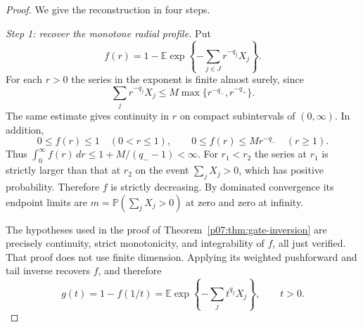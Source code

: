 \documentclass[11pt,letterpaper]{article}
\theoremstyle{definition}
\theoremstyle{remark}
\newcommand{\E}{\mathbb E}
\newcommand{\Pp}{\mathbb P}
\newcommand{\1}{\mathbf 1}
\begin{document}
\begin{proof}
We give the reconstruction in four steps.

\emph{Step 1: recover the monotone radial profile.}
Put
\[
 f(r)=1-\E\exp\left\{-\sum_{j\in J}r^{-q_j}X_j\right\}.
\]
For each $r>0$ the series in the exponent is finite almost surely, since
\[
 \sum_jr^{-q_j}X_j
 \leq M\max\{r^{-q_-},r^{-q_+}\}.
\]
The same estimate gives continuity in $r$ on compact subintervals of
$(0,\infty)$. In addition,
\begin{equation}\label{p07:eq:countable-gate-tail-bound}
 0\leq f(r)\leq1\quad(0<r\leq1),\qquad
 0\leq f(r)\leq M r^{-q_-}\quad(r\geq1).
\end{equation}
Thus $\int_0^\infty f(r)\,dr\leq1+M/(q_--1)<\infty$.
For $r_1<r_2$ the series at $r_1$ is strictly larger than that at $r_2$
on the event $\sum_jX_j>0$, which has positive probability. Therefore
$f$ is strictly decreasing. By dominated convergence its endpoint limits
are $m=\Pp(\sum_jX_j>0)$ at zero and zero at infinity.

The hypotheses used in the proof of
Theorem~\ref{p07:thm:gate-inversion} are precisely continuity, strict
monotonicity, and integrability of $f$, all just verified. That proof
does not use finite dimension. Applying its weighted pushforward and
tail inverse recovers $f$, and therefore
\begin{equation}\label{p07:eq:countable-blind-g}
 g(t)=1-f(1/t)
      =\E\exp\left\{-\sum_jt^{q_j}X_j\right\},\qquad t>0.
\end{equation}


\end{proof}
\end{document}
